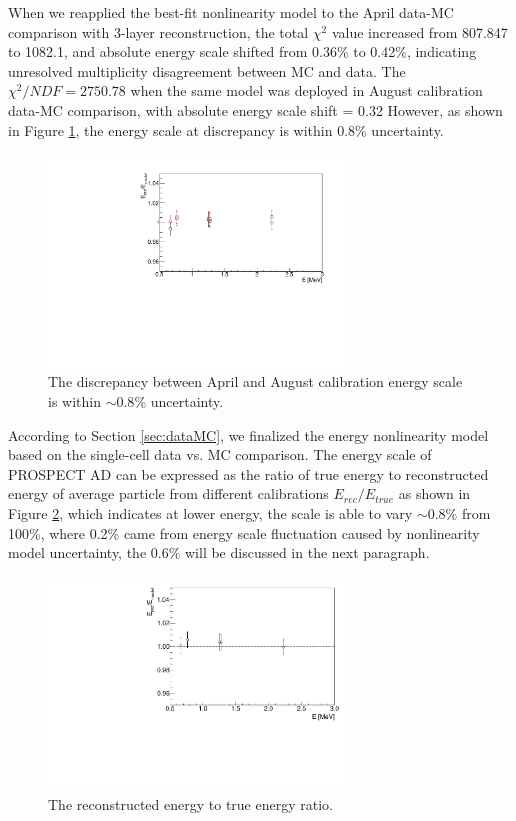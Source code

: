 When we reapplied the best-fit nonlinearity model to the April data-MC comparison with 3-layer reconstruction, the total $\chi^2$ value increased from 807.847 to 1082.1, and absolute energy scale shifted from 0.36\% to 0.42\%, indicating unresolved multiplicity disagreement between MC and data.
The $\chi^2/NDF = 2750.78$ when the same model was deployed in August calibration data-MC comparison, with absolute energy scale shift = 0.32
However, as shown in Figure \ref{fig:compare}, the energy scale at discrepancy is within 0.8\% uncertainty.

\begin{figure}[h!]
\centering
\includegraphics[width=80mm]{Figures/EScaleCompare.pdf}
\caption{The discrepancy between April and August calibration energy scale is within $\sim0.8\%$ uncertainty.}
\label{fig:compare}
\end{figure}

\newpage

According to Section \ref{sec:dataMC}, we finalized the energy nonlinearity model based on the single-cell data vs. MC comparison.
The energy scale of PROSPECT AD can be expressed as the ratio of true energy to reconstructed energy of average particle from different calibrations $E_{rec}/E_{true}$ as shown in Figure \ref{fig:escale}, which indicates at lower energy, the scale is able to vary $\sim0.8\%$ from 100\%, where 0.2\% came from energy scale fluctuation caused by nonlinearity model uncertainty, the 0.6\% will be discussed in the next paragraph.

\begin{figure}[h!]
\centering
\includegraphics[width=80mm]{Figures/EScale.pdf}
\caption{The reconstructed energy to true energy ratio.}
\label{fig:escale}
\end{figure}

